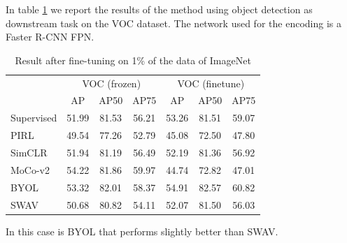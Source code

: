 In table \ref{tab:object-detection-swav} we report the results of the method using object detection as downstream task on the VOC dataset. The network used for the encoding is a Faster R-CNN FPN.
\begin{table}[H]
	\centering
	\begin{tabular}{l|ccc|ccc|}
		\cline{2-7}
		& \multicolumn{3}{c|}{VOC (frozen)} & \multicolumn{3}{c|}{VOC (finetune)} \\ \cline{2-7} 
		& \multicolumn{1}{c}{AP} & \multicolumn{1}{c}{AP50} & \multicolumn{1}{c|}{AP75} & \multicolumn{1}{c}{AP} & \multicolumn{1}{c}{AP50} & \multicolumn{1}{c|}{AP75} \\ \hline
		\multicolumn{1}{|l|}{Supervised} & 51.99 & 81.53 & 56.21 & 53.26 & 81.51 & 59.07 \\ \hline
		\multicolumn{1}{|l|}{PIRL} & 49.54 & 77.26 & 52.79 & 45.08 & 72.50 & 47.80 \\ \cline{1-1}
		\multicolumn{1}{|l|}{SimCLR} & 51.94 & 81.19 & 56.49 & 52.19 & 81.36 & 56.92 \\ \cline{1-1}
		\multicolumn{1}{|l|}{MoCo-v2} & 54.22 & 81.86 & 59.97 & 44.74 & 72.82 & 47.01 \\ \cline{1-1}
		\multicolumn{1}{|l|}{BYOL} & 53.32 & 82.01 & 58.37 & 54.91 & 82.57 & 60.82 \\ \cline{1-1}
		\multicolumn{1}{|l|}{SWAV} & 50.68 & 80.82 & 54.11 & 52.07 & 81.50 & 56.03 \\ 
		\hline
	\end{tabular}
	\caption{Result after fine-tuning on 1\% of the data of ImageNet}
	\label{tab:object-detection-swav}
\end{table}
In this case is BYOL that performs slightly better than SWAV.

